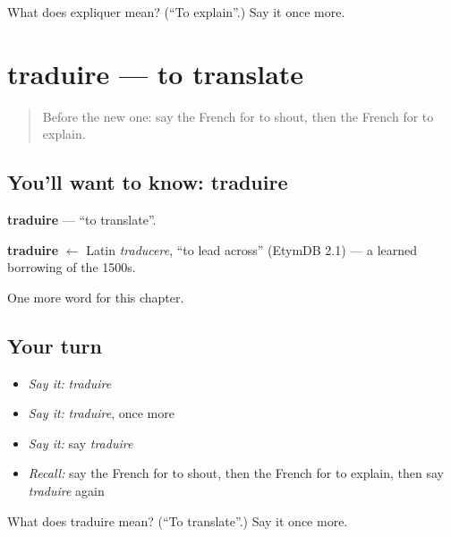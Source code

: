 \begin{tcolorbox}[breakable,colback=teal!4,colframe=teal!35!black,title={Before you move on}]
What does expliquer mean? (\textquotedblleft{}To explain\textquotedblright{}.) Say it once more.
\end{tcolorbox}
\section[traduire]{traduire — to translate}

\label{lesson:FR-C144-traduire}



\begin{quote}
Before the new one: say the French for to shout, then the French for to explain.
\end{quote}

\subsection*{You'll want to know: traduire}
\textbf{traduire} — \textquotedblleft{}to translate\textquotedblright{}.

\begin{cousinweb}
\textbf{traduire} $\leftarrow$ Latin \emph{traducere}, \textquotedblleft{}to lead across\textquotedblright{} (EtymDB 2.1) — a learned borrowing of the 1500s.
\end{cousinweb}

\begin{grammarlens}[title={What you've built}]
One more word for this chapter.
\end{grammarlens}

\subsection*{Your turn}
\begin{itemize}
\raggedright
  \item \emph{Say it:} \emph{traduire}
  \item \emph{Say it:} \emph{traduire}, once more
  \item \emph{Say it:} say \emph{traduire}
  \item \emph{Recall:} say the French for to shout, then the French for to explain, then say \emph{traduire} again
\end{itemize}

\begin{tcolorbox}[breakable,colback=teal!4,colframe=teal!35!black,title={Before you move on}]
What does traduire mean? (\textquotedblleft{}To translate\textquotedblright{}.) Say it once more.
\end{tcolorbox}
